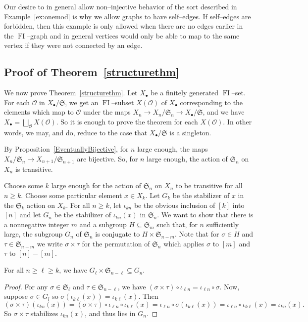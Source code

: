 \documentclass[ALCO,ThmDefs,Unicode,epreuves]{cedram}
\newcommand\cO{\mathcal{O}}
\DeclareMathOperator{\FI}{FI}
\newcommand{\Sn}{\mathfrak{S}}
\begin{document}
Our desire to in general allow non--injective behavior of the sort described in Example~\ref{ex:onemod} is why we allow graphs to have self--edges. If self--edges are forbidden, then this example is only allowed when there are no edges earlier in the $\FI$--graph and in general vertices would only be able to map to the same vertex if they were not connected by an edge.


\subsection{Proof of Theorem~\ref{structurethm}}

We now prove Theorem~\ref{structurethm}. Let $X_{\bullet}$ be a finitely generated $\FI$--set. 
For each $\cO$ in $X_{\bullet}/\Sn$, we get an $\FI$--subset $X(\cO)$ of $X_{\bullet}$ corresponding to the elements which map to $\cO$ under the maps $X_n \longrightarrow X_n/\Sn_n \longrightarrow X_{\bullet}/\Sn$, and we have $X_{\bullet} = \bigsqcup_{\cO} X(\cO)$. 
So it is enough to prove the theorem for each $X(\cO)$. In other words, we may, and do, reduce to the case that $X_{\bullet}/\Sn$ is a singleton.

By Proposition~\ref{EventuallyBijective}, for $n$ large enough, the maps $X_n / \Sn_n \to X_{n+1} / \Sn_{n+1}$ are bijective. 
So, for $n$ large enough, the action of $\Sn_n$ on $X_n$ is transitive.

Choose some $k$ large enough for the action of $\Sn_n$ on $X_n$ to be transitive for all $n \geq k$. Choose some particular element $x \in X_k$. Let $G_k$ be the stabilizer of $x$ in the $\Sn_k$ action on $X_k$.
For all $n \geq k$, let $\iota_{kn}$ be the obvious inclusion of $[k]$ into $[n]$ and let $G_n$ be the stabilizer of $\iota_{kn}(x)$ in $\Sn_n$. 
We want to show that there is a nonnegative integer $m$ and a subgroup $H \subseteq \Sn_m$ such that, for $n$ sufficiently large, the subgroup $G_n$ of $\Sn_n$ is conjugate to $H \times \Sn_{n-m}$. Note that for $\sigma \in H$ and $\tau \in \Sn_{n-m}$ we write $\sigma \times \tau$ for the permutation of $\Sn_{n}$ which applies $\sigma$ to $[m]$ and $\tau$ to $[n] - [m]$.


\begin{lemma} \label{StabilizerGrowth}
For all $n \geq \ell \geq k$, we have $G_{\ell} \times \Sn_{n-\ell} \subseteq G_n$.
\end{lemma}

\begin{proof}
For any $\sigma \in \Sn_{\ell}$ and $\tau \in \Sn_{n-\ell}$, we have $(\sigma \times \tau) \circ \iota_{\ell n} = \iota_{\ell n} \circ \sigma$.
Now, suppose $\sigma \in G_l$ so $\sigma (\iota_{k \ell}(x)) = \iota_{k \ell}(x)$. Then 
\[ (\sigma \times \tau) \left( \iota_{kn}(x) \right) = (\sigma \times \tau) \circ \iota_{\ell n} \circ \iota_{k\ell}(x) = \iota_{\ell n} \circ \sigma \left( \iota_{k\ell}(x) \right) = \iota_{\ell n} \circ \iota_{k\ell}(x) = \iota_{kn}(x). \]
So $\sigma \times \tau$ stabilizes $\iota_{kn}(x)$, and thus lies in $G_n$.
\end{proof}
\end{document}
